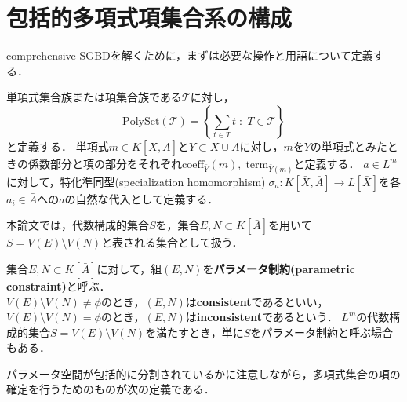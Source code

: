 \section{包括的多項式項集合系の構成}
comprehensive SGBDを解くために，まずは必要な操作と用語について定義する．
\par
単項式集合族または項集合族である$\mathscr{T}$に対し，$$\displaystyle \mathrm{PolySet}(\mathscr{T}) = \left\{ \sum_{t \in T} t \; : \; T \in \mathscr{T} \right\}$$
と定義する．
単項式$m \in K[\bar{X}, \bar{A}]$と$\bar{Y} \subset \bar{X} \cup \bar{A}$に対し，$m$を$\bar{Y}$の単項式とみたときの係数部分と項の部分をそれぞれ$\mathrm{coeff}_{\bar{Y}}(m), \; \mathrm{term}_{\bar{Y}(m)}$と定義する．
$a \in L^m$に対して，特化準同型(specialization homomorphism)$\; \sigma_a : K[\bar{X}, \bar{A}] \to L[\bar{X}]$を各$a_i \in \bar{A}$への$a$の自然な代入として定義する．
\par
本論文では，代数構成的集合$S$を，集合$E, N \subset K[\bar{A}]$を用いて$S = V(E) \setminus V(N)$と表される集合として扱う．
\begin{definition}
	\label{chapter04:definition:parameter_constraint}
	集合$E, N \subset K[\bar{A}]$に対して，組$(E, N)$を\textbf{パラメータ制約(parametric constraint)}と呼ぶ．\\
	$V(E) \setminus V(N) \ne \phi$のとき，$(E, N)$は\textbf{consistent}であるといい，$V(E) \setminus V(N) = \phi$のとき，$(E, N)$は\textbf{inconsistent}であるという．
	$L^m$の代数構成的集合$S = V(E) \setminus V(N)$を満たすとき，単に$S$をパラメータ制約と呼ぶ場合もある．
\end{definition}
パラメータ空間が包括的に分割されているかに注意しながら，多項式集合の項の確定を行うためのものが次の定義である．
